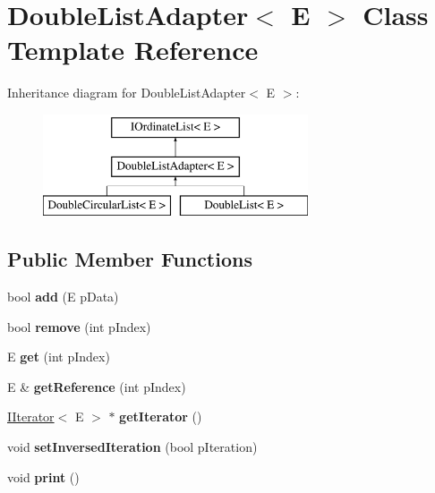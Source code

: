 \hypertarget{class_double_list_adapter}{\section{Double\-List\-Adapter$<$ E $>$ Class Template Reference}
\label{class_double_list_adapter}
}
Inheritance diagram for Double\-List\-Adapter$<$ E $>$\-:\begin{figure}[H]
\begin{center}
\leavevmode
\includegraphics[height=3.000000cm]{class_double_list_adapter}
\end{center}
\end{figure}
\subsection*{Public Member Functions}
\begin{DoxyCompactItemize}
\item 
\hypertarget{class_double_list_adapter_a6f5bc523f04b3b223f259a72a1975b11}{bool {\bfseries add} (E p\-Data)}\label{class_double_list_adapter_a6f5bc523f04b3b223f259a72a1975b11}

\item 
\hypertarget{class_double_list_adapter_a76d83f0f676236b98aa5e555a43a173b}{bool {\bfseries remove} (int p\-Index)}\label{class_double_list_adapter_a76d83f0f676236b98aa5e555a43a173b}

\item 
\hypertarget{class_double_list_adapter_a70017142377b23a0f6ec22ac4c01aa6c}{E {\bfseries get} (int p\-Index)}\label{class_double_list_adapter_a70017142377b23a0f6ec22ac4c01aa6c}

\item 
\hypertarget{class_double_list_adapter_ad608ef5f6917c09899b55fc5b20d9b4b}{E \& {\bfseries get\-Reference} (int p\-Index)}\label{class_double_list_adapter_ad608ef5f6917c09899b55fc5b20d9b4b}

\item 
\hypertarget{class_double_list_adapter_a40ba21fc70df64e91bf269bb721d20a9}{\hyperlink{class_i_iterator}{I\-Iterator}$<$ E $>$ $\ast$ {\bfseries get\-Iterator} ()}\label{class_double_list_adapter_a40ba21fc70df64e91bf269bb721d20a9}

\item 
\hypertarget{class_double_list_adapter_a95df61b73f8c9535c8abe227c2207ea9}{void {\bfseries set\-Inversed\-Iteration} (bool p\-Iteration)}\label{class_double_list_adapter_a95df61b73f8c9535c8abe227c2207ea9}

\item 
\hypertarget{class_double_list_adapter_a7f67c49e4d93576b9ccbf3578904df30}{void {\bfseries print} ()}\label{class_double_list_adapter_a7f67c49e4d93576b9ccbf3578904df30}

\end{DoxyCompactItemize}
